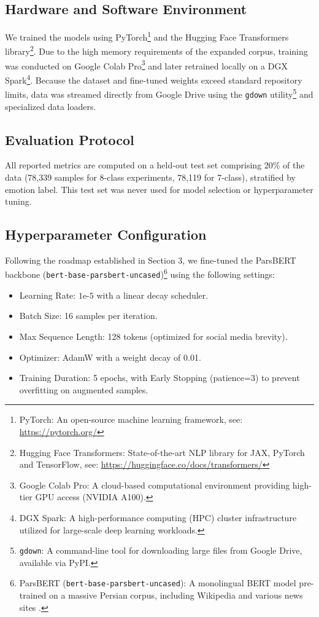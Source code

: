\documentclass[runningheads]{llncs}
\begin{document}
\subsection{Hardware and Software Environment}
We trained the models using PyTorch\footnote{PyTorch: An open-source machine learning framework, see: \url{https://pytorch.org/}} and the Hugging Face Transformers library\footnote{Hugging Face Transformers: State-of-the-art NLP library for JAX, PyTorch and TensorFlow, see: \url{https://huggingface.co/docs/transformers/}}. Due to the high memory requirements of the expanded corpus, training was conducted on Google Colab Pro\footnote{Google Colab Pro: A cloud-based computational environment providing high-tier GPU access (NVIDIA A100).} and later retrained locally on a DGX Spark\footnote{DGX Spark: A high-performance computing (HPC) cluster infrastructure utilized for large-scale deep learning workloads.}. Because the dataset and fine-tuned weights exceed standard repository limits, data was streamed directly from Google Drive using the \texttt{gdown} utility\footnote{\texttt{gdown}: A command-line tool for downloading large files from Google Drive, available via PyPI.} and specialized data loaders.
\subsection{Evaluation Protocol}
All reported metrics are computed on a held-out test set comprising 20\% of the 
data (78,339 samples for 8-class experiments, 78,119 for 7-class), stratified by 
emotion label. This test set was never used for model selection or hyperparameter 
tuning.

\subsection{Hyperparameter Configuration}
Following the roadmap established in Section 3, we fine-tuned the ParsBERT backbone (\texttt{bert-base-parsbert-uncased})\footnote{ParsBERT (\texttt{bert-base-parsbert-uncased}): A monolingual BERT model pre-trained on a massive Persian corpus, including Wikipedia and various news sites \cite{farahani2021parsbert}.} using the following settings:
\begin{itemize}
    \item Learning Rate: $1\text{e-}5$ with a linear decay scheduler.
    \item Batch Size: 16 samples per iteration.
    \item Max Sequence Length: 128 tokens (optimized for social media brevity).
    \item Optimizer: AdamW with a weight decay of 0.01.
    \item Training Duration: 5 epochs, with Early Stopping (patience=3) to prevent overfitting on augmented samples.
\end{itemize}
\end{document}
